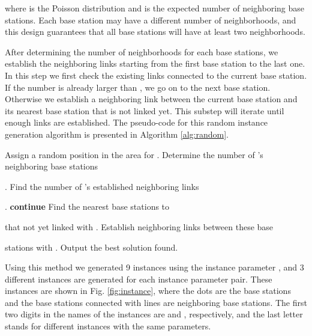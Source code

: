 \documentclass[conference]{IEEEtran}
\begin{document}
where  is the Poisson distribution and  is the expected number of neighboring base stations. Each base station may have a different number of neighborhoods, and this design guarantees that all base stations will have at least two neighborhoods.

After determining the number of neighborhoods for each base stations, we establish the neighboring links starting from the first base station to the last one. In this step we first check the existing links connected to the current base station. If the number is already larger than , we go on to the next base station. Otherwise we establish a neighboring link between the current base station and its nearest base station that is not linked yet. This substep will iterate until enough links are established. The pseudo-code for this random instance generation algorithm is presented in Algorithm \ref{alg:random}.

\begin{algorithm}
\caption{}
  \begin{algorithmic}[1]
    \State Assign a random position in the area for .
  \EndFor
    \State Determine the number of 's neighboring base stations \par .
  \EndFor
    \State Find the number of 's established neighboring links \par .
    \If {}
      \State \textbf{continue}
    \Else
      \State Find the  nearest base stations to  \par\hspace{0.7em} that not yet linked with .
      \State Establish neighboring links between these base \par\hspace{1.1em}stations with .
    \EndIf
  \EndFor
  \State Output the best solution found.
  \end{algorithmic}
  \label{alg:random}
\end{algorithm}

Using this method we generated 9 instances using the instance parameter , and 3 different instances are generated for each instance parameter pair. These instances are shown in Fig. \ref{fig:instance}, where the dots are the base stations and the base stations connected with lines are neighboring base stations. The first two digits in the names of the instances are  and , respectively, and the last letter stands for different instances with the same parameters.
\end{document}

